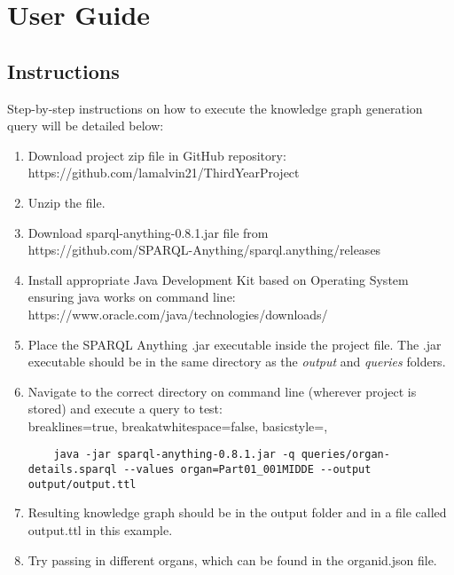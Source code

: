 \chapter{User Guide}
\section{Instructions}
Step-by-step instructions on how to execute the knowledge graph generation query will be detailed below:

\begin{enumerate}
    \item Download project zip file in GitHub repository: \\ https://github.com/lamalvin21/ThirdYearProject
    \item Unzip the file.
    \item Download sparql-anything-0.8.1.jar file from \\ https://github.com/SPARQL-Anything/sparql.anything/releases
    \item Install appropriate Java Development Kit based on Operating System ensuring java works on command line: \\ https://www.oracle.com/java/technologies/downloads/
    \item Place the SPARQL Anything .jar executable inside the project file. The .jar executable should be in the same directory as the \textit{output} and \textit{queries} folders. 
    \item Navigate to the correct directory on command line (wherever project is stored) and execute a query to test: \\ 
    \vspace{-0.4cm}
    \lstset
    {
        breaklines=true,
        breakatwhitespace=false,
        basicstyle=\linespread{1}\ttfamily,
    }
    \begin{lstlisting}
    java -jar sparql-anything-0.8.1.jar -q queries/organ-details.sparql --values organ=Part01_001MIDDE --output output/output.ttl
    \end{lstlisting}
    \vspace{-0.25cm}
        \item Resulting knowledge graph should be in the output folder and in a file called output.ttl in this example.
        \item Try passing in different organs, which can be found in the organid.json file.
\end{enumerate}
